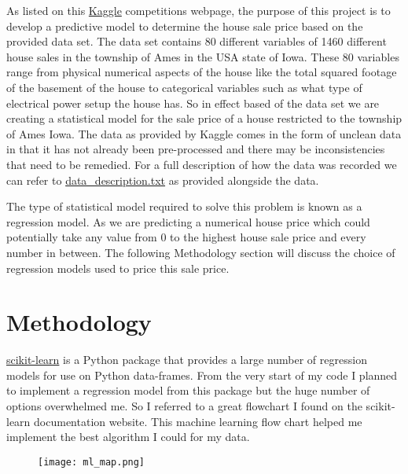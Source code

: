 \documentclass[a4paper]{article}
\begin{document}
    \par As listed on this \href{https://www.kaggle.com/c/house-prices-advanced-regression-techniques/overview/description}{Kaggle} competitions webpage, the purpose of this project is to develop a predictive model to determine the house sale price based on the provided data set. The data set contains 80 different variables of 1460 different house sales in the township of Ames in the USA state of Iowa. These 80 variables range from physical numerical aspects of the house like the total squared footage of the basement of the house to categorical variables such as what type of electrical power setup the house has. So in effect based of the data set we are creating a statistical model for the sale price of a house restricted to the township of Ames Iowa. The data as provided by Kaggle comes in the form of unclean data in that it has not already been pre-processed and there may be inconsistencies that need to be remedied. For a full description of how the data was recorded we can refer to \href{https://github.com/HStuklis/my-projects/blob/master/house-prices/data_description.txt}{data\_description.txt} as provided alongside the data. 
    \par The type of statistical model required to solve this problem is known as a regression model. As we are predicting a numerical house price which could potentially take any value from 0 to the highest house sale price and every number in between. The following Methodology section will discuss the choice of regression models used to price this sale price.

\section{Methodology}
    \href{https://scikit-learn.org/stable/}{scikit-learn} is a Python package that provides a large number of regression models for use on Python data-frames. From the very start of my code I planned to implement a regression model from this package but the huge number of options overwhelmed me. So I referred to a great flowchart I found on the scikit-learn documentation website. This machine learning flow chart helped me implement the best algorithm I could for my data.

    \begin{figure}[H]
        \centering
        \texttt{[image: ml\_map.png]}
    \end{figure}
\end{document}
